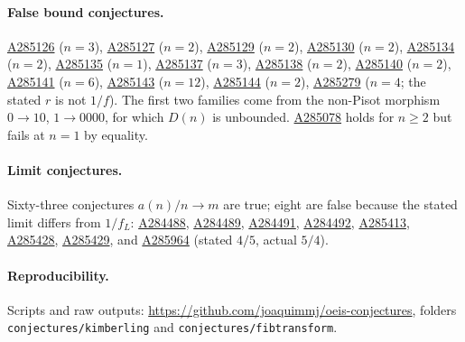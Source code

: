 \documentclass[11pt]{article}
\newcommand{\oeis}[1]{\href{https://oeis.org/#1}{#1}}
\begin{document}
\paragraph{False bound conjectures.} \oeis{A285126} ($n=3$), \oeis{A285127} ($n=2$), \oeis{A285129} ($n=2$),
\oeis{A285130} ($n=2$), \oeis{A285134} ($n=2$), \oeis{A285135} ($n=1$), \oeis{A285137} ($n=3$), \oeis{A285138}
($n=2$), \oeis{A285140} ($n=2$), \oeis{A285141} ($n=6$), \oeis{A285143} ($n=12$), \oeis{A285144} ($n=2$),
\oeis{A285279} ($n=4$; the stated $r$ is not $1/f$). The first two families come from the non-Pisot morphism
$0\to10$, $1\to0000$, for which $D(n)$ is unbounded. \oeis{A285078} holds for $n\ge2$ but fails at $n=1$ by equality.

\paragraph{Limit conjectures.} Sixty-three conjectures $a(n)/n\to m$ are true; eight are false because the stated
limit differs from $1/f_L$: \oeis{A284488}, \oeis{A284489}, \oeis{A284491}, \oeis{A284492}, \oeis{A285413},
\oeis{A285428}, \oeis{A285429}, and \oeis{A285964} (stated $4/5$, actual $5/4$).

\paragraph{Reproducibility.} Scripts and raw outputs: \url{https://github.com/joaquimmj/oeis-conjectures}, folders
\texttt{conjectures/kimberling} and \texttt{conjectures/fibtransform}.
\end{document}
